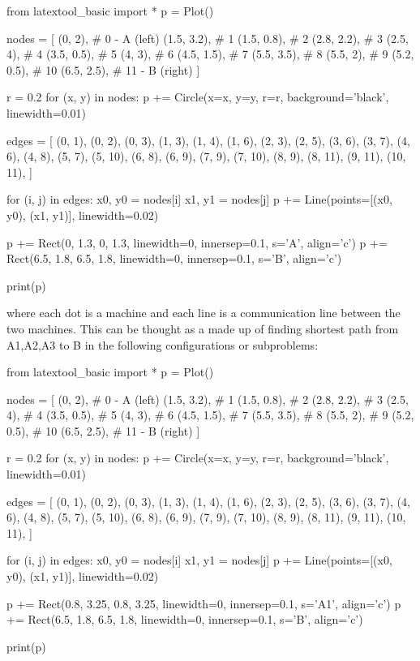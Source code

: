 \begin{python}
from latextool_basic import *
p = Plot()

nodes = [
    (0, 2),      # 0 - A (left)
    (1.5, 3.2),  # 1
    (1.5, 0.8),  # 2
    (2.8, 2.2),  # 3
    (2.5, 4),    # 4
    (3.5, 0.5),  # 5
    (4, 3),      # 6
    (4.5, 1.5),  # 7
    (5.5, 3.5),  # 8
    (5.5, 2),    # 9
    (5.2, 0.5),  # 10
    (6.5, 2.5),  # 11 - B (right)
]

r = 0.2
for (x, y) in nodes:
    p += Circle(x=x, y=y, r=r, background='black', linewidth=0.01)

edges = [
    (0, 1), (0, 2), (0, 3),
    (1, 3), (1, 4), (1, 6),
    (2, 3), (2, 5),
    (3, 6), (3, 7),
    (4, 6), (4, 8),
    (5, 7), (5, 10),
    (6, 8), (6, 9),
    (7, 9), (7, 10),
    (8, 9), (8, 11),
    (9, 11),
    (10, 11),
]

for (i, j) in edges:
    x0, y0 = nodes[i]
    x1, y1 = nodes[j]
    p += Line(points=[(x0, y0), (x1, y1)], linewidth=0.02)

p += Rect(0, 1.3, 0, 1.3, linewidth=0, innersep=0.1, s='A', align='c')
p += Rect(6.5, 1.8, 6.5, 1.8, linewidth=0, innersep=0.1, s='B', align='c')

print(p)
\end{python}

where each dot is a machine and each line is a communication line
between the two machines. This can be thought as a made up of finding
shortest path from A1,A2,A3 to B in the following configurations or
subproblems:

\begin{python}
from latextool_basic import *
p = Plot()

nodes = [
    (0, 2),      # 0 - A (left)
    (1.5, 3.2),  # 1
    (1.5, 0.8),  # 2
    (2.8, 2.2),  # 3
    (2.5, 4),    # 4
    (3.5, 0.5),  # 5
    (4, 3),      # 6
    (4.5, 1.5),  # 7
    (5.5, 3.5),  # 8
    (5.5, 2),    # 9
    (5.2, 0.5),  # 10
    (6.5, 2.5),  # 11 - B (right)
]

r = 0.2
for (x, y) in nodes:
    p += Circle(x=x, y=y, r=r, background='black', linewidth=0.01)

edges = [
    (0, 1), (0, 2), (0, 3),
    (1, 3), (1, 4), (1, 6),
    (2, 3), (2, 5),
    (3, 6), (3, 7),
    (4, 6), (4, 8),
    (5, 7), (5, 10),
    (6, 8), (6, 9),
    (7, 9), (7, 10),
    (8, 9), (8, 11),
    (9, 11),
    (10, 11),
]

for (i, j) in edges:
    x0, y0 = nodes[i]
    x1, y1 = nodes[j]
    p += Line(points=[(x0, y0), (x1, y1)], linewidth=0.02)

p += Rect(0.8, 3.25, 0.8, 3.25, linewidth=0, innersep=0.1, s='A1', align='c')
p += Rect(6.5, 1.8, 6.5, 1.8, linewidth=0, innersep=0.1, s='B', align='c')

print(p)
\end{python}

